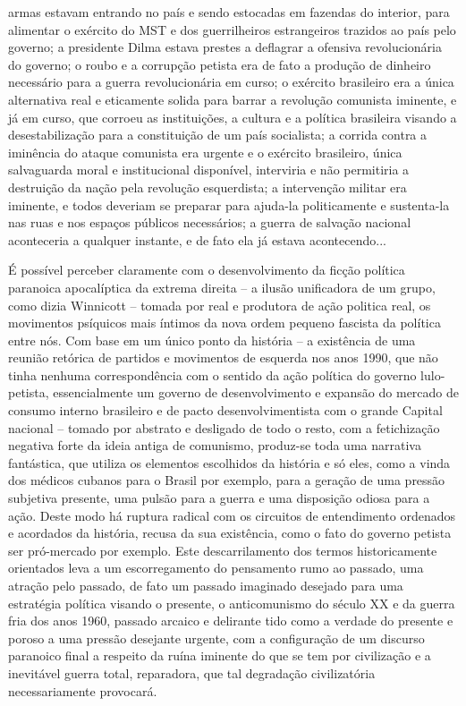 {armas estavam entrando no país e sendo estocadas em fazendas do
interior, para alimentar o exército do MST e dos guerrilheiros
estrangeiros trazidos ao país pelo governo; a presidente Dilma estava
prestes a deflagrar a ofensiva revolucionária do governo; o roubo e a
corrupção petista era de fato a produção de dinheiro necessário para a
guerra revolucionária em curso; o exército brasileiro era a única
alternativa real e eticamente solida para barrar a revolução comunista
iminente, e já em curso, que corroeu as instituições, a cultura e a
política brasileira visando a desestabilização para a constituição de um
país socialista; a corrida contra a iminência do ataque comunista era
urgente e o exército brasileiro, única salvaguarda moral e institucional
disponível, interviria e não permitiria a destruição da nação pela
revolução esquerdista; a intervenção militar era iminente, e todos
deveriam se preparar para ajuda-la politicamente e sustenta-la nas ruas
e nos espaços públicos necessários; a guerra de salvação nacional
aconteceria a qualquer instante, e de fato ela já estava acontecendo...}

É possível perceber claramente com o desenvolvimento da ficção política
paranoica apocalíptica da extrema direita -- a ilusão unificadora de um
grupo, como dizia Winnicott -- tomada por real e produtora de ação
politica real, os movimentos psíquicos mais íntimos da nova ordem
pequeno fascista da política entre nós. Com base em um único ponto da
história -- a existência de uma reunião retórica de partidos e
movimentos de esquerda nos anos 1990, que não tinha nenhuma
correspondência com o sentido da ação política do governo lulo-petista,
essencialmente um governo de desenvolvimento e expansão do mercado de
consumo interno brasileiro e de pacto desenvolvimentista com o grande
Capital nacional -- tomado por abstrato e desligado de todo o resto, com
a fetichização negativa forte da ideia antiga de comunismo, produz-se
toda uma narrativa fantástica, que utiliza os elementos escolhidos da
história e só eles, como a vinda dos médicos cubanos para o Brasil por
exemplo, para a geração de uma pressão subjetiva presente, uma pulsão
para a guerra e uma disposição odiosa para a ação. Deste modo há ruptura
radical com os circuitos de entendimento ordenados e acordados da
história, recusa da sua existência, como o fato do governo petista ser
pró-mercado por exemplo. Este descarrilamento dos termos historicamente
orientados leva a um escorregamento do pensamento rumo ao passado, uma
atração pelo passado, de fato um passado imaginado desejado para uma
estratégia política visando o presente, o anticomunismo do século XX e
da guerra fria dos anos 1960, passado arcaico e delirante tido como a
verdade do presente e poroso a uma pressão desejante urgente, com a
configuração de um discurso paranoico final a respeito da ruína iminente
do que se tem por civilização e a inevitável guerra total, reparadora,
que tal degradação civilizatória necessariamente provocará.

